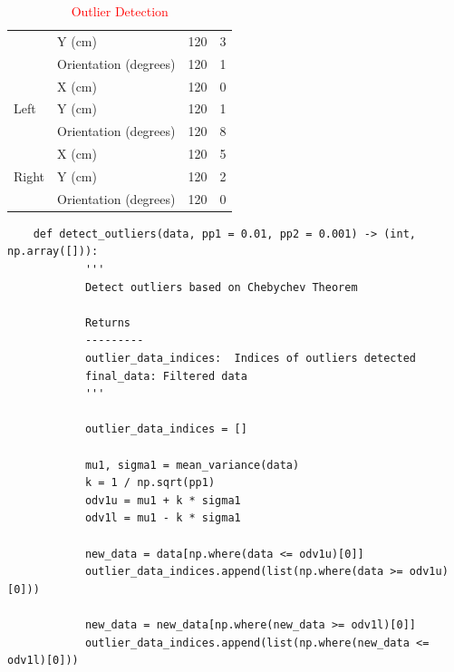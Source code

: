 {\begin{itemize}
\begin{itemize}
\begin{table}[]
{\begin{tabular}{l l r r}
                                         & Y (cm)                &       120               & 3             \\  
                                         & Orientation (degrees) &         120             & 1             \\  
                \multirow{3}{*}{Left}    & X (cm)                &        120              & 0             \\ 
                                         & Y (cm)                &        120              & 1             \\  
                                         & Orientation (degrees) &          120            & 8             \\ 
                \multirow{3}{*}{Right}   & X (cm)                &           120           & 5             \\  
                                         & Y (cm)                &           120           & 2             \\ 
                                         & Orientation (degrees) &           120           & 0            \\ \hline
                \end{tabular}%
                }
                \caption{\textcolor{red}{Outlier Detection}}
                \label{tab:outliers}
            \end{table}
    
            \begin{verbatim}
    def detect_outliers(data, pp1 = 0.01, pp2 = 0.001) -> (int, np.array([])):
            '''
            Detect outliers based on Chebychev Theorem
            
            Returns
            ---------
            outlier_data_indices:  Indices of outliers detected
            final_data: Filtered data
            '''
            
            outlier_data_indices = []
            
            mu1, sigma1 = mean_variance(data)
            k = 1 / np.sqrt(pp1)
            odv1u = mu1 + k * sigma1
            odv1l = mu1 - k * sigma1
            
            new_data = data[np.where(data <= odv1u)[0]]
            outlier_data_indices.append(list(np.where(data >= odv1u)[0]))
            
            new_data = new_data[np.where(new_data >= odv1l)[0]]
            outlier_data_indices.append(list(np.where(new_data <= odv1l)[0]))
            

\end{verbatim}
\end{itemize}
\end{itemize}}
